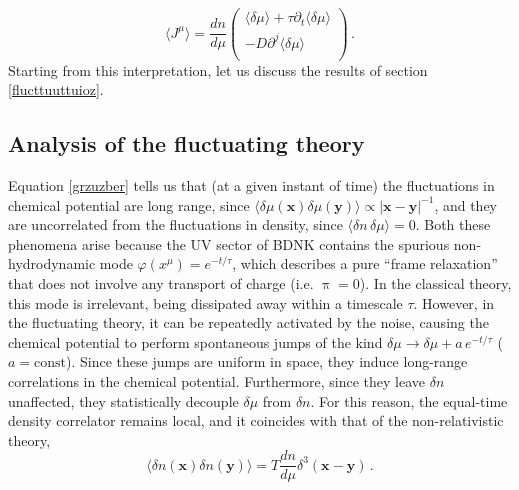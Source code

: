 \documentclass[a4paper, amsfonts, amssymb, amsmath, reprint, showkeys, nofootinbib, twoside,notitlepage,onecolumn]{revtex4-2}
\newcommand{\x}{{\textbf{x}}}
\newcommand{\y}{{\textbf{y}}}
\theoremstyle{definition}
\begin{document}
\begin{equation}
  \langle J^\mu \rangle  = \dfrac{dn}{d\mu}
    \begin{pmatrix}
        \langle\delta \mu\rangle {+}\tau \partial_t \langle\delta \mu\rangle \\
        -D \partial^j \langle\delta \mu \rangle  \\
    \end{pmatrix}   \, .
\end{equation}
Starting from this interpretation, let us discuss the results of section \ref{flucttuuttuioz}. 

\subsection{Analysis of the fluctuating theory}

Equation \eqref{grzuzber} tells us that (at a given instant of time) the fluctuations in chemical potential are long range, since $\langle \delta \mu(\x) \delta \mu(\y) \rangle \propto |\x-\y|^{-1}$, and they are uncorrelated from the fluctuations in density, since $\langle \delta n \, \delta \mu \rangle=0$. Both these phenomena arise because the UV sector of BDNK contains the spurious non-hydrodynamic mode $\varphi(x^\mu)=e^{-t/\tau}$, which describes a pure ``frame relaxation'' that does not involve any transport of charge (i.e. $\uppi=0$). In the classical theory, this mode is irrelevant, being dissipated away within a timescale $\tau$. However, in the fluctuating theory, it can be repeatedly activated by the noise, causing the chemical potential to perform spontaneous jumps of the kind $\delta \mu \rightarrow \delta \mu +a \, e^{-t/\tau}$ ($a=\text{const}$). Since these jumps are uniform in space, they induce long-range correlations in the chemical potential. Furthermore, since they leave $\delta n$ unaffected, they statistically decouple $\delta \mu$ from $\delta n$. For this reason, the equal-time density correlator remains local, and it coincides with that of the non-relativistic theory,
\begin{equation}
    \langle \delta n(\x) \delta  n (\y)\rangle = T \dfrac{dn}{d\mu} \delta^3(\x-\y) \, .
\end{equation}
\end{document}
